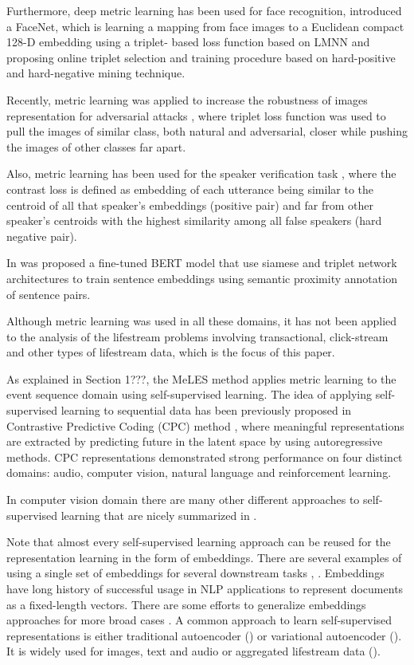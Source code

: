 \documentclass[sigconf, anonymous]{acmart}
\begin{document}
Furthermore, deep metric learning has been used for face recognition, \cite{Schroff2015FaceNetAU} introduced a FaceNet, which is learning a mapping from face images to a Euclidean compact 128-D embedding using a triplet- based loss function based on LMNN \cite{weinberger2006distance} and proposing online triplet selection and training procedure based on hard-positive and hard-negative mining technique. 

Recently, metric learning was applied to increase the robustness of images representation for adversarial attacks \cite{Mao2019AdvRobust}, where triplet loss function was used to pull the images of similar class, both natural and adversarial, closer while pushing the images of other classes far apart. 

Also, metric learning has been used for the speaker verification task \cite{wan2017generalized}, where the contrast loss is defined as embedding of each utterance being similar to the centroid of all that speaker's embeddings (positive pair) and far from other speaker's centroids with the highest similarity among all false speakers (hard negative pair).

In \cite{reimers-2019-sentence-bert} was proposed a fine-tuned BERT model \cite{Devlin2019BERTPO} that use siamese and triplet network architectures to train sentence embeddings using semantic proximity annotation of sentence pairs.

Although metric learning was used in all these domains, it has not been applied to the analysis of the lifestream problems involving transactional, click-stream and other types of lifestream data, which is the focus of this paper.

As explained in Section 1???, the MeLES method applies metric learning to the event sequence domain using self-supervised learning. 
The idea of applying self-supervised learning to sequential data has been previously proposed in Contrastive Predictive Coding (CPC) method \cite{DBLP:journals/corr/abs-1807-03748}, where
meaningful representations are extracted by predicting future in the latent space by using autoregressive methods. CPC representations demonstrated strong performance on four distinct domains: audio, computer vision, natural language and reinforcement learning.

In computer vision domain there are many other different approaches to self-supervised learning that are nicely summarized in \cite{jing2019selfsupervised}.

Note that almost every self-supervised learning approach can be reused for the representation learning in the form of embeddings. There are several examples of using a single set of embeddings for several downstream tasks \cite{Song2017LearningUE}, \cite{Zhai:2019:LUE:3292500.3330739}.
Embeddings have long history of successful usage in NLP applications to represent documents as a fixed-length vectors. There are some efforts to generalize embeddings approaches for more broad cases \cite{Wu2017StarSpaceEA}.
A common approach to learn self-supervised representations is either traditional autoencoder (\cite{rumelhart1985learning}) or variational autoencoder (\cite{kingma2013auto}). It is widely used for images, text and audio or aggregated lifestream data (\cite{mancisidor2019learning}).
\end{document}
